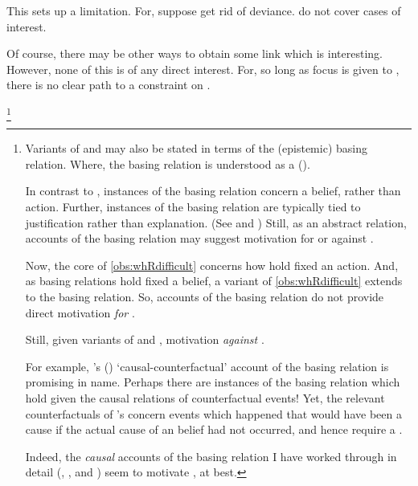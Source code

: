 \begin{note}
  This sets up a limitation.
  For, suppose get rid of deviance.
   do not cover cases of interest.

  Of course, there may be other ways to obtain some link which is interesting.
  However, none of this is of any direct interest.
  For, so long as focus is given to , there is no clear path to a constraint on .
\end{note}


\begin{note}
  \footnote{
    Variants of \qWhy{} and \qHow{} may also be stated in terms of the (epistemic) basing relation.
    Where, the basing relation is understood as a  (\cite{Korcz:2021ue}).

    In contrast to , instances of the basing relation concern a belief, rather than action.
    Further, instances of the basing relation are typically tied to justification rather than explanation.
    (See \cite{Korcz:2021ue} and \cite[35]{Pollock:1999tm})
    Still, as an abstract relation, accounts of the basing relation may suggest motivation for or against \issueInclusion{}.

    Now, the core of \autoref{obs:whRdifficult} concerns how  hold fixed an action.
    And, as basing relations hold fixed a belief, a variant of \autoref{obs:whRdifficult} extends to the basing relation.
    So, accounts of the basing relation do not provide direct motivation \emph{for} \issueInclusion{}.

    Still, given variants of \qWhy{} and \qHow{}, motivation \emph{against} \issueInclusion{}.

    For example, \citeauthor{Swain:1981wd}'s (\citeyear{Swain:1981wd}) `causal-counterfactual' account of the basing relation is promising in name.
    Perhaps there are instances of the basing relation which hold given the causal relations of counterfactual events!
    Yet, the relevant counterfactuals of \citeauthor{Swain:1981wd}'s concern events which happened that would have been a cause if the actual cause of an \agents{} belief had not occurred, and hence require a .

    Indeed, the \emph{causal} accounts of the basing relation I have worked through in detail (\cite{Moser:1989tv}, \cite{Ye:2020ux}, and \cite{Turri:2011aa}) seem to motivate \issueInclusion{}, at best.

}
\end{note}

